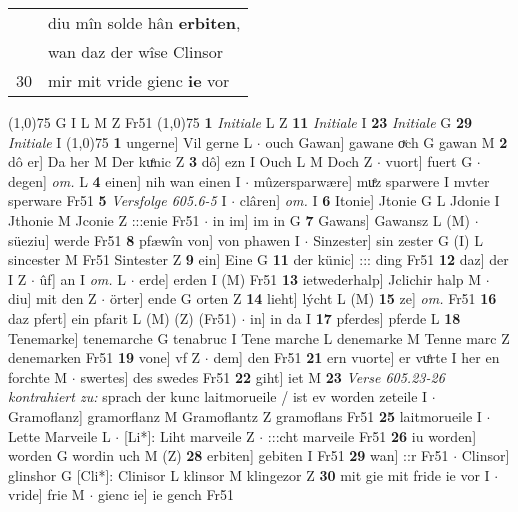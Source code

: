 \documentclass[8pt,a4paper,notitlepage]{article}
\begin{document}
\begin{table}[ht]
\begin{minipage}[t]{0.5\linewidth}
\begin{tabular}{rl}
 & diu mîn solde hân \textbf{erbiten},\\ 
 & wan daz der wîse Clinsor\\ 
30 & mir mit vride gienc \textbf{ie} vor\\ 
\end{tabular}
\scriptsize
\line(1,0){75} \newline
G I L M Z Fr51 \newline
\line(1,0){75} \newline
\textbf{1} \textit{Initiale} L Z  \textbf{11} \textit{Initiale} I  \textbf{23} \textit{Initiale} G  \textbf{29} \textit{Initiale} I  \newline
\line(1,0){75} \newline
\textbf{1} ungerne] Vil gerne L  $\cdot$ ouch Gawan] gawane oͮch G gawan M \textbf{2} dô er] Da her M Der kuͤnic Z \textbf{3} dô] ezn I Ouch L M Doch Z  $\cdot$ vuort] fuert G  $\cdot$ degen] \textit{om.} L \textbf{4} einen] nih wan einen I  $\cdot$ mûzersparwære] muͤz sparwere I mvter sperware Fr51 \textbf{5} \textit{Versfolge 605.6-5} I   $\cdot$ clâren] \textit{om.} I \textbf{6} Itonie] Jtonie G L Jdonie I Jthonie M Jconie Z :::enie Fr51  $\cdot$ in im] im in G \textbf{7} Gawans] Gawansz L (M)  $\cdot$ süeziu] werde Fr51 \textbf{8} pfæwîn von] von phawen I  $\cdot$ Sinzester] sin zester G (I) L sincester M Fr51 Sintester Z \textbf{9} ein] Eine G \textbf{11} der künic] ::: ding Fr51 \textbf{12} daz] der I Z  $\cdot$ ûf] an I \textit{om.} L  $\cdot$ erde] erden I (M) Fr51 \textbf{13} ietwederhalp] Jclichir halp M  $\cdot$ diu] mit den Z  $\cdot$ örter] ende G orten Z \textbf{14} lieht] lýcht L (M) \textbf{15} ze] \textit{om.} Fr51 \textbf{16} daz pfert] ein pfarit L (M) (Z) (Fr51)  $\cdot$ in] in da I \textbf{17} pferdes] pferde L \textbf{18} Tenemarke] tenemarche G tenabruc I Tene marche L denemarke M Tenne marc Z denemarken Fr51 \textbf{19} vone] vf Z  $\cdot$ dem] den Fr51 \textbf{21} ern vuorte] er vuͤrte I her en forchte M  $\cdot$ swertes] des swedes Fr51 \textbf{22} giht] iet M \textbf{23} \textit{Verse 605.23-26 kontrahiert zu:} sprach der kunc laitmorueile / ist ev worden zeteile I   $\cdot$ Gramoflanz] gramorflanz M Gramoflantz Z gramoflans Fr51 \textbf{25} laitmorueile I  $\cdot$ Lette Marveile L  $\cdot$ [Li*]: Liht marveile Z  $\cdot$ :::cht marveile Fr51 \textbf{26} iu worden] worden G wordin uch M (Z) \textbf{28} erbiten] gebiten I Fr51 \textbf{29} wan] ::r Fr51  $\cdot$ Clinsor] glinshor G [Cli*]: Clinisor L klinsor M klingezor Z \textbf{30} mit gie mit fride ie vor I  $\cdot$ vride] frie M  $\cdot$ gienc ie] ie gench Fr51 \newline

\end{minipage}
\end{table}
\end{document}
